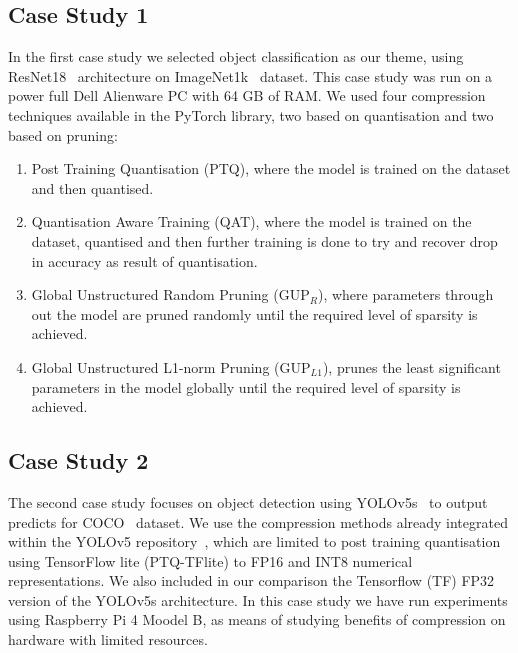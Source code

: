 \subsection{Case Study 1}
In the first case study we selected object classification as our theme, using ResNet18~\cite{he2015deep} architecture on ImageNet1k~\cite{imagenet_cvpr09} dataset. This case study was run on a power full Dell Alienware PC with 64 GB of RAM.
%
We used four compression techniques available in the 
 PyTorch library, two based on quantisation and two based on pruning: 
\begin{enumerate}
    \item Post Training Quantisation (PTQ), where the model is trained on the dataset and then quantised.
    
    \item Quantisation Aware Training (QAT), where the model is trained on the dataset, quantised and then further training is done to try and recover drop in accuracy as result of quantisation.

    \item Global Unstructured Random Pruning (GUP$_R$), where parameters through out the model are pruned randomly until the required level of sparsity is achieved. 

    \item Global Unstructured L1-norm Pruning (GUP$_{L1}$), prunes the least significant parameters in the model globally until the required level of sparsity is achieved. 
\end{enumerate}

\subsection{Case Study 2}
The second case study focuses on object detection using YOLOv5s~\cite{Jocher_YOLOv5_by_Ultralytics_2020} to output predicts for COCO~\cite{lin2015microsoft} dataset.
%
We use the compression methods already integrated within the YOLOv5 repository~\cite{Jocher_YOLOv5_by_Ultralytics_2020}, which are limited to post training quantisation using TensorFlow lite (PTQ-TFlite) to FP16 and INT8 numerical representations. We also included in our comparison the Tensorflow (TF) FP32 version of the YOLOv5s architecture. 
%
In this case study we have run experiments using Raspberry Pi 4 Moodel B, as means of studying benefits of compression on hardware with limited resources.

